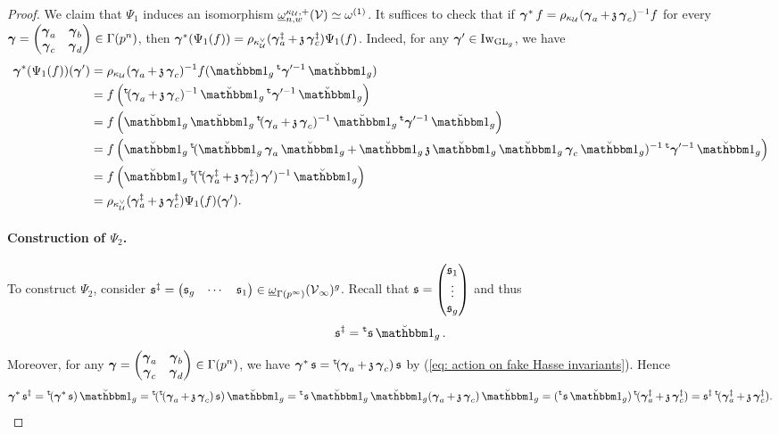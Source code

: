 \begin{proof}
We claim that $\Psi_1$ induces an isomorphism $\underline{\omega}_{n,w}^{\kappa_{\operatorname{\mathcal{U}}},+}(\operatorname{\mathcal{V}})\simeq \omega^{(1)}$. It suffices to check that if $\operatorname{\boldsymbol{\gamma}}^* f = \rho_{\kappa_{\operatorname{\mathcal{U}}}}(\operatorname{\boldsymbol{\gamma}}_a + \operatorname{\mathfrak{z}}\operatorname{\boldsymbol{\gamma}}_c)^{-1} f$ for every $\operatorname{\boldsymbol{\gamma}} = \begin{pmatrix}\operatorname{\boldsymbol{\gamma}}_a & \operatorname{\boldsymbol{\gamma}}_b\\ \operatorname{\boldsymbol{\gamma}}_c & \operatorname{\boldsymbol{\gamma}}_d\end{pmatrix} \in \Gamma(p^n)$, then $\operatorname{\boldsymbol{\gamma}}^*(\Psi_1(f)) = \rho_{\kappa_{\operatorname{\mathcal{U}}}^{\vee}}(\operatorname{\boldsymbol{\gamma}}_a^{\ddagger} + \operatorname{\mathfrak{z}}\operatorname{\boldsymbol{\gamma}}_c^{\ddagger})\Psi_1(f)$. Indeed, for any $\operatorname{\boldsymbol{\gamma}}'\in \operatorname{Iw}_{\operatorname{GL}_g}$, we have \begin{align*}
    \bfgamma^*(\Psi_1(f))(\bfgamma') & = \rho_{\kappa_{\calU}}(\bfgamma_a + \frakz\bfgamma_c)^{-1} f(\oneanti_g \trans\bfgamma'^{-1}\oneanti_g)\\
    & = f\left(\trans(\bfgamma_a + \frakz \bfgamma_c)^{-1}\oneanti_g \trans\bfgamma'^{-1}\oneanti_g\right)\\
    & = f\left(\oneanti_g \oneanti_g\trans(\bfgamma_a + \frakz \bfgamma_c)^{-1}\oneanti_g \trans\bfgamma'^{-1}\oneanti_g\right)\\
    & = f\left(\oneanti_g \trans(\oneanti_g \bfgamma_a \oneanti_g + \oneanti_g\frakz\oneanti_g \oneanti_g \bfgamma_c \oneanti_g)^{-1}\trans\bfgamma'^{-1}\oneanti_g\right)\\
    & = f\left(\oneanti_g \trans(\trans(\bfgamma_a^{\ddagger}+\frakz\bfgamma_c^{\ddagger})\bfgamma')^{-1}\oneanti_g\right)\\
    & = \rho_{\kappa_{\calU}^{\vee}}(\bfgamma_a^{\ddagger} + \frakz\bfgamma_c^{\ddagger}) \Psi_1(f)(\bfgamma').
\end{align*}

\paragraph{Construction of $\Psi_2$.}
To construct $\Psi_2$, consider $\operatorname{\mathfrak{s}}^{\ddagger} = \begin{pmatrix}\operatorname{\mathfrak{s}}_g & \cdots & \operatorname{\mathfrak{s}}_1\end{pmatrix}\in \underline{\omega}_{\Gamma(p^{\infty})}(\operatorname{\mathcal{V}}_{\infty})^g$. Recall that $\operatorname{\mathfrak{s}} = \begin{pmatrix}\operatorname{\mathfrak{s}}_1\\ \vdots \\ \operatorname{\mathfrak{s}}_g\end{pmatrix}$ and thus \[
    \fraks^{\ddagger} = \trans\fraks\oneanti_g.
\] Moreover, for any $\operatorname{\boldsymbol{\gamma}} = \begin{pmatrix}\operatorname{\boldsymbol{\gamma}}_a & \operatorname{\boldsymbol{\gamma}}_b \\ \operatorname{\boldsymbol{\gamma}}_c & \operatorname{\boldsymbol{\gamma}}_d\end{pmatrix} \in \Gamma(p^n)$, we have $\operatorname{\boldsymbol{\gamma}}^* \operatorname{\mathfrak{s}} = \operatorname{^{\mathtt{t}}\!}(\operatorname{\boldsymbol{\gamma}}_a + \operatorname{\mathfrak{z}}\operatorname{\boldsymbol{\gamma}}_c)\operatorname{\mathfrak{s}}$ by (\ref{eq: action on fake Hasse invariants}). Hence $$
    \bfgamma^* \fraks^{\ddagger}  = \trans(\bfgamma^* \fraks) \oneanti_g = \trans(\trans(\bfgamma_a + \frakz \bfgamma_c)\fraks)\oneanti_g= \trans\fraks \oneanti_g \oneanti_g (\bfgamma_a + \frakz \bfgamma_c)\oneanti_g = (\trans\fraks \oneanti_g) \trans(\bfgamma_a^{\ddagger} + \frakz \bfgamma_c^{\ddagger})= \fraks^{\ddagger} \trans(\bfgamma_a^{\ddagger} + \frakz \bfgamma_c^{\ddagger}).
$$


\end{proof}

